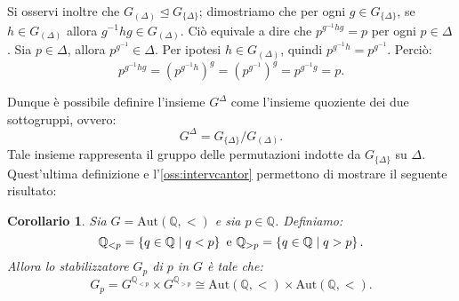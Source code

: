\documentclass[12pt,a4paper,openright]{report}
\newcommand{\aut}{ \mathrm{Aut} ( \mathbb{Q},< ) } %
\newcommand{\Q}{\mathbb{Q}} %
\newcommand{\0}{\setminus\{0\}} %
\newcommand{\stab}[1]{G_{#1}}   %
\theoremstyle{definition}
\theoremstyle{plain}
\newtheorem{cor}[defn]{Corollario}
\begin{document}
Si osservi inoltre che $G_{(\Delta)} \trianglelefteq G_{\{\Delta\}}$; dimostriamo che per ogni $g \in G_{\{\Delta\}}$, se $h \in G_{(\Delta)}$ allora $g^{-1}hg \in G_{(\Delta)}$. Ciò equivale a dire che $p^{g^{-1}hg}=p$ per ogni $p \in \Delta$. Sia $p \in \Delta$, allora $p^{g^{-1}} \in \Delta$. Per ipotesi $h \in G_{(\Delta)}$, quindi $p^{g^{-1}h}=p^{g^{-1}}$. Perciò:
\[p^{g^{-1}hg}=\left(p^{g^{-1}h}\right)^{g}=\left(p^{g^{-1}}\right)^{g}=p^{g^{-1}g}=p.\]

Dunque è possibile definire l'insieme $G^\Delta$ come l'insieme quoziente dei due sottogruppi, ovvero:
\[G^\Delta=G_{\{\Delta\}}/ G_{(\Delta)}.\]
Tale insieme rappresenta il gruppo delle permutazioni indotte da $G_{\{\Delta\}}$ su $\Delta$. \\
Quest'ultima definizione e l'\cref{oss:intervcantor} permettono di mostrare il seguente risultato:
\begin{cor}
    Sia $G=\aut$ e sia $p \in \Q$. Definiamo:
    \[\Q_{<p}=\left\lbrace q \in \Q \centering\mid q < p \right\rbrace \mbox{ e  } \Q_{>p}=\left\lbrace q \in \Q \centering\mid q > p \right\rbrace .\]
    Allora lo stabilizzatore $\stab{p}$ di $p$ in $G$ è tale che:
    \[\stab{p}=G^{\Q_{<p}}\times G^{\Q_{>p}} \cong \aut \times \aut.\]
\end{cor}
\end{document}
